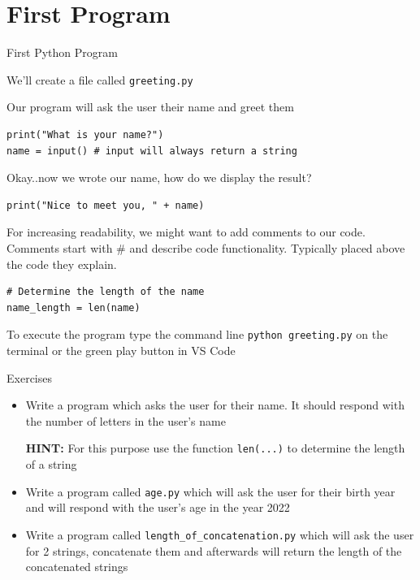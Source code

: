 \documentclass[
	11pt, 
]{beamer}
\begin{document}
\section{First Program}
\small
\begin{frame}[fragile]{First Python Program}

We'll create a file called \texttt{greeting.py}

Our program will ask the user their name and greet them

\pause


\begin{verbatim}
print("What is your name?")
name = input() # input will always return a string
\end{verbatim}

Okay..now we wrote our name, how do we display the result?

\pause
\begin{verbatim}
print("Nice to meet you, " + name)
\end{verbatim}

For increasing readability, we might want to add comments to our code.
Comments start with \# and describe code functionality.
Typically placed above the code they explain.

\begin{verbatim}
# Determine the length of the name
name_length = len(name)
\end{verbatim}

To execute the program type the command line \texttt{python greeting.py} on the terminal or the green play button in VS Code
    
\end{frame}



\begin{frame}{Exercises}


\begin{itemize}
    \item Write a program which asks the user for their name. It should respond with the number of letters in the user's name

    \textbf{HINT:} For this purpose use the function \texttt{len(...)} to determine the length of a string

    \vspace{.5cm}

    \item Write a program called \texttt{age.py} which will ask the user for their birth year and will respond with the user's age in the year 2022

    \vspace{.5cm}

    \item Write a program called \texttt{length\_of\_concatenation.py} which will ask the user for 2 strings, concatenate them and afterwards will return the length of the concatenated strings
\end{itemize}

\end{frame}
\end{document}
